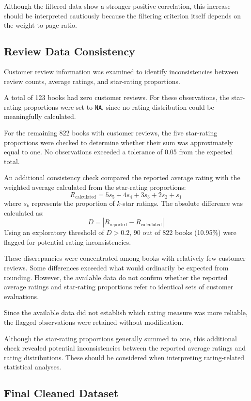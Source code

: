 \documentclass[11pt,a4paper]{article}
\begin{document}
Although the filtered data show a stronger positive
correlation, this increase should be interpreted
cautiously because the filtering criterion itself
depends on the weight-to-page ratio.

\subsection{Review Data Consistency}

Customer review information was examined to identify
inconsistencies between review counts, average ratings,
and star-rating proportions.

A total of 123 books had zero customer reviews. For
these observations, the star-rating proportions were
set to \texttt{NA}, since no rating distribution could
be meaningfully calculated.

For the remaining 822 books with customer reviews,
the five star-rating proportions were checked to
determine whether their sum was approximately equal
to one. No observations exceeded a tolerance of
0.05 from the expected total.

An additional consistency check compared the reported
average rating with the weighted average calculated
from the star-rating proportions:
\[
R_{\mathrm{calculated}}
= 5s_5 + 4s_4 + 3s_3 + 2s_2 + s_1
\]
where $s_k$ represents the proportion of
$k$-star ratings.
The absolute difference was calculated as:
\[
D = |R_{\mathrm{reported}} - R_{\mathrm{calculated}}|
\]
Using an exploratory threshold of $D > 0.2$,
90 out of 822 books (10.95\%) were flagged
for potential rating inconsistencies.

These discrepancies were concentrated among
books with relatively few customer reviews.
Some differences exceeded what would ordinarily
be expected from rounding. However, the available
data do not confirm whether the reported average
ratings and star-rating proportions refer to
identical sets of customer evaluations.

Since the available data did not establish
which rating measure was more reliable,
the flagged observations were retained
without modification.

Although the star-rating proportions generally
summed to one, this additional check revealed
potential inconsistencies between the reported
average ratings and rating distributions.
These should be considered when interpreting
rating-related statistical analyses.

\newpage
\subsection{Final Cleaned Dataset}
\end{document}
